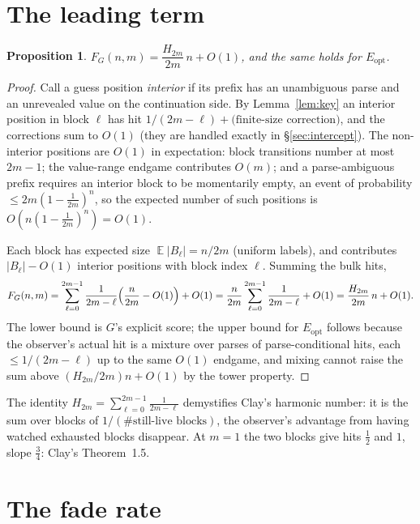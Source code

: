 \documentclass[11pt]{article}
\newtheorem{proposition}[theorem]{Proposition}
\theoremstyle{definition}
\DeclareMathOperator{\EE}{\mathbb{E}}
\newcommand{\eopt}{E_{\mathrm{opt}}}
\newcommand{\Fg}{F_G}
\newcommand{\bigoh}{O}
\begin{document}
\section{The leading term}\label{sec:slope}

\begin{proposition}\label{prop:slope}
$\Fg(n,m)=\dfrac{H_{2m}}{2m}\,n+\bigoh(1)$, and the same holds for $\eopt$.
\end{proposition}

\begin{proof}
Call a guess position \emph{interior} if its prefix has an unambiguous parse and an unrevealed
value on the continuation side. By Lemma~\ref{lem:key} an interior position in block $\ell$ has
hit $1/(2m-\ell)+\text{(finite-size correction)}$, and the corrections sum to $\bigoh(1)$ (they
are handled exactly in \S\ref{sec:intercept}). The non-interior positions are $\bigoh(1)$ in
expectation: block transitions number at most $2m-1$; the value-range endgame contributes
$\bigoh(m)$; and a parse-ambiguous prefix requires an interior block to be momentarily empty,
an event of probability $\le 2m(1-\tfrac1{2m})^n$, so the expected number of such positions is
$\bigoh(n(1-\tfrac1{2m})^n)=\bigoh(1)$.

Each block has expected size $\EE|B_\ell|=n/2m$ (uniform labels), and contributes
$|B_\ell|-\bigoh(1)$ interior positions with block index $\ell$. Summing the bulk hits,
\[
  \Fg(n,m)=\sum_{\ell=0}^{2m-1}\frac{1}{2m-\ell}\Bigl(\frac{n}{2m}-\bigoh(1)\Bigr)+\bigoh(1)
  =\frac{n}{2m}\sum_{\ell=0}^{2m-1}\frac1{2m-\ell}+\bigoh(1)
  =\frac{H_{2m}}{2m}\,n+\bigoh(1).
\]
The lower bound is $G$'s explicit score; the upper bound for $\eopt$ follows because the
observer's actual hit is a mixture over parses of parse-conditional hits, each $\le
1/(2m-\ell)$ up to the same $\bigoh(1)$ endgame, and mixing cannot raise the sum above
$(H_{2m}/2m)n+\bigoh(1)$ by the tower property.
\end{proof}

The identity $H_{2m}=\sum_{\ell=0}^{2m-1}\tfrac{1}{2m-\ell}$ demystifies Clay's harmonic
number: it is the sum over blocks of $1/(\#\text{still-live blocks})$, the observer's advantage
from having watched exhausted blocks disappear. At $m=1$ the two blocks give hits $\tfrac12$
and $1$, slope $\tfrac34$: Clay's Theorem~1.5.

\section{The fade rate}\label{sec:fade}
\end{document}
